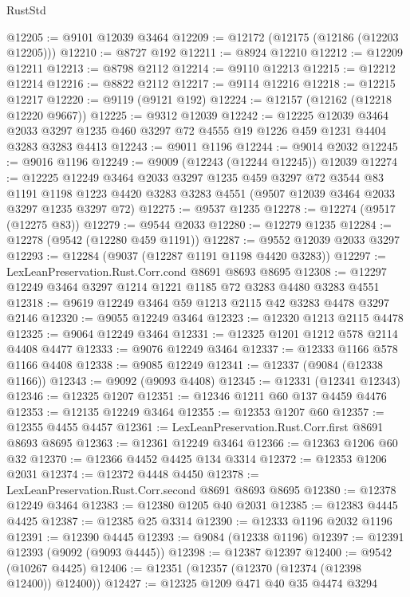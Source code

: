\begin{lexlean}{RustStd}
\begin{coremodule}
@12205 := @9101 @12039 @3464
@12209 := @12172 (@12175 (@12186 (@12203 @12205)))
@12210 := @8727 @192
@12211 := @8924 @12210
@12212 := @12209 @12211
@12213 := @8798 @2112
@12214 := @9110 @12213
@12215 := @12212 @12214
@12216 := @8822 @2112
@12217 := @9114 @12216
@12218 := @12215 @12217
@12220 := @9119 (@9121 @192)
@12224 := @12157 (@12162 (@12218 @12220 @9667))
@12225 := @9312 @12039
@12242 := @12225
    @12039
    @3464
    @2033
    @3297
    @1235
    @460
    @3297
    @72
    @4555
    @19
    @1226
    @459
    @1231
    @4404
    @3283
    @3283
    @4413
@12243 := @9011 @1196
@12244 := @9014 @2032
@12245 := @9016 @1196
@12249 := @9009 (@12243 (@12244 @12245)) @12039
@12274 := @12225
    @12249
    @3464
    @2033
    @3297
    @1235
    @459
    @3297
    @72
    @3544
    @83
    @1191
    @1198
    @1223
    @4420
    @3283
    @3283
    @4551
    (@9507 @12039 @3464 @2033 @3297 @1235 @3297 @72)
@12275 := @9537 @1235
@12278 := @12274 (@9517 (@12275 @83))
@12279 := @9544 @2033
@12280 := @12279 @1235
@12284 := @12278 (@9542 (@12280 @459 @1191))
@12287 := @9552 @12039 @2033 @3297
@12293 := @12284 (@9037 (@12287 @1191 @1198 @4420 @3283))
@12297 := LexLeanPreservation.Rust.Corr.cond @8691 @8693 @8695
@12308 := @12297 @12249 @3464 @3297 @1214 @1221 @1185 @72 @3283 @4480 @3283 @4551
@12318 := @9619 @12249 @3464 @59 @1213 @2115 @42 @3283 @4478 @3297 @2146
@12320 := @9055 @12249 @3464
@12323 := @12320 @1213 @2115 @4478
@12325 := @9064 @12249 @3464
@12331 := @12325 @1201 @1212 @578 @2114 @4408 @4477
@12333 := @9076 @12249 @3464
@12337 := @12333 @1166 @578 @1166 @4408
@12338 := @9085 @12249
@12341 := @12337 (@9084 (@12338 @1166))
@12343 := @9092 (@9093 @4408)
@12345 := @12331 (@12341 @12343)
@12346 := @12325 @1207
@12351 := @12346 @1211 @60 @137 @4459 @4476
@12353 := @12135 @12249 @3464
@12355 := @12353 @1207 @60
@12357 := @12355 @4455 @4457
@12361 := LexLeanPreservation.Rust.Corr.first @8691 @8693 @8695
@12363 := @12361 @12249 @3464
@12366 := @12363 @1206 @60 @32
@12370 := @12366 @4452 @4425 @134 @3314
@12372 := @12353 @1206 @2031
@12374 := @12372 @4448 @4450
@12378 := LexLeanPreservation.Rust.Corr.second @8691 @8693 @8695
@12380 := @12378 @12249 @3464
@12383 := @12380 @1205 @40 @2031
@12385 := @12383 @4445 @4425
@12387 := @12385 @25 @3314
@12390 := @12333 @1196 @2032 @1196
@12391 := @12390 @4445
@12393 := @9084 (@12338 @1196)
@12397 := @12391 @12393 (@9092 (@9093 @4445))
@12398 := @12387 @12397
@12400 := @9542 (@10267 @4425)
@12406 := @12351 (@12357 (@12370 (@12374 (@12398 @12400)) @12400))
@12427 := @12325
    @1209
    @471
    @40
    @35
    @4474
    @3294

\end{coremodule}
\end{lexlean}

